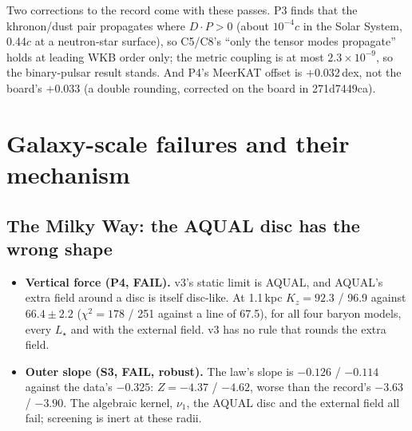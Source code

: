 \documentclass[10pt]{article}
\begin{document}
Two corrections to the record come with these passes. P3 finds that the khronon/dust pair propagates where $D\cdot P>0$ (about $10^{-4}c$ in the Solar System, 0.44$c$ at a neutron-star surface), so C5/C8's ``only the tensor modes propagate'' holds at leading WKB order only; the metric coupling is at most $2.3\times10^{-9}$, so the binary-pulsar result stands. And P4's MeerKAT offset is $+0.032$\,dex, not the board's $+0.033$ (a double rounding, corrected on the board in 271d7449ca).

\section{Galaxy-scale failures and their mechanism}
\subsection{The Milky Way: the AQUAL disc has the wrong shape}
\begin{itemize}
\item \textbf{Vertical force (P4, FAIL).} v3's static limit is AQUAL, and AQUAL's extra field around a disc is itself disc-like. At 1.1\,kpc $K_z=92.3$ / 96.9 against $66.4\pm2.2$ ($\chi^2=178$ / 251 against a line of 67.5), for all four baryon models, every $L_\star$ and with the external field. v3 has no rule that rounds the extra field.
\item \textbf{Outer slope (S3, FAIL, robust).} The law's slope is $-0.126$ / $-0.114$ against the data's $-0.325$: $Z=-4.37$ / $-4.62$, worse than the record's $-3.63$ / $-3.90$. The algebraic kernel, $\nu_1$, the AQUAL disc and the external field all fail; screening is inert at these radii.
\end{itemize}
\end{document}
